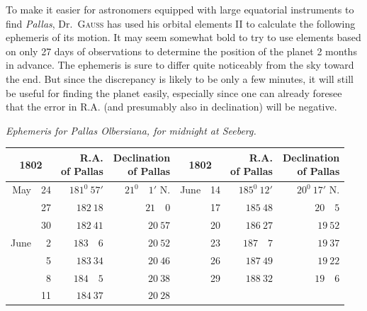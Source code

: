 To make it easier for astronomers equipped with large equatorial instruments to find \textit{Pallas}, Dr.\ \textsc{Gauss} has used his orbital elements II to calculate the following ephemeris of its motion. It may seem somewhat bold to try to use elements based on only 27 days of observations to determine the position of the planet 2 months in advance. The ephemeris is sure to differ quite noticeably from the sky toward the end. But since the discrepancy is likely to be only a few minutes, it will still be useful for finding the planet easily, especially since one can already foresee that the error in R.A. (and presumably also in declination) will be negative.
\begin{center}
\textit{Ephemeris for Pallas Olbersiana, for midnight at Seeberg.}\par\medskip
{\small\setlength{\tabcolsep}{5pt}
\begin{tabular}{r r|r|r@{\qquad}r r|r|r}
\multicolumn{2}{c|}{1802}&\shortstack{R.A.\\of Pallas}&\shortstack{Declination\\of Pallas}&\multicolumn{2}{c|}{1802}&\shortstack{R.A.\\of Pallas}&\shortstack{Declination\\of Pallas}\\\hline
May&24&$181^0\ 57'$&$21^0\quad1'$ N.&June&14&$185^0\ 12'$&$20^0\ 17'$ N.\\
&27&$182\ 18$&$21\quad0$&&17&$185\ 48$&$20\quad5$\\
&30&$182\ 41$&$20\ 57$&&20&$186\ 27$&$19\ 52$\\
June&2&$183\quad6$&$20\ 52$&&23&$187\quad7$&$19\ 37$\\
&5&$183\ 34$&$20\ 46$&&26&$187\ 49$&$19\ 22$\\
&8&$184\quad5$&$20\ 38$&&29&$188\ 32$&$19\quad6$\\
&11&$184\ 37$&$20\ 28$&&&&
\end{tabular}}
\end{center}
\begin{flushright}\end{flushright}
